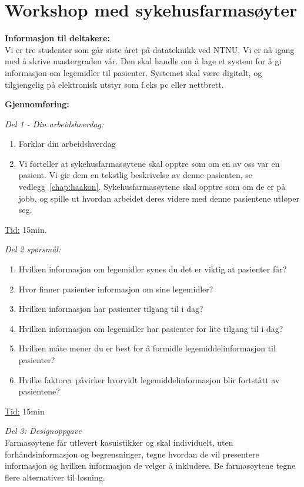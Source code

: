 \chapter{Workshop med sykehusfarmasøyter} \label{chap:1stWorkshop}

\textbf{Informasjon til deltakere:} \\
Vi er tre studenter som går siste året på datateknikk ved NTNU. Vi er nå igang med å skrive mastergraden vår. Den skal handle om å lage et system for å gi informasjon om legemidler til pasienter. Systemet skal være digitalt, og tilgjengelig på elektronisk utstyr som f.eks pc eller nettbrett. 

\textbf{Gjennomføring:}

\textit{Del 1 - Din arbeidshverdag:} 
\begin{enumerate}
\item Forklar din arbeidshverdag
\item Vi forteller at sykehusfarmasøytene skal opptre som om en av oss var en pasient. Vi gir dem en tekstlig beskrivelse av denne pasienten, se vedlegg~\ref{chap:haakon}. Sykehusfarmasøytene skal opptre som om de er på jobb, og spille ut hvordan arbeidet deres videre med denne pasientene utløper seg.
\end{enumerate}

\underline{Tid:} 15min.

\textit{Del 2 spørsmål:}
\begin{enumerate}
\item Hvilken informasjon om legemidler synes du det er viktig at pasienter får?
\item Hvor finner pasienter informasjon om sine legemidler?
\item Hvilken informasjon har pasienter tilgang til i dag?
\item Hvilken informasjon om legemidler har pasienter for lite tilgang til i dag?
\item Hvilken måte mener du er best for å formidle legemiddelinformasjon til pasienter?
\item Hvilke faktorer påvirker hvorvidt legemiddelinformasjon blir fortstått av pasientene?
\end{enumerate}

\underline{Tid:} 15min

\textit{Del 3: Designoppgave}\\
Farmasøytene får utlevert kasuistikker og skal individuelt, uten forhåndsinformasjon og begrensninger, tegne hvordan de vil presentere informasjon og hvilken informasjon de velger å inkludere. Be farmasøytene tegne flere alternativer til løsning. 


